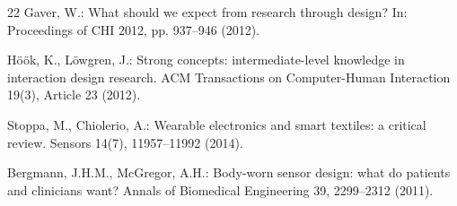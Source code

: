 \documentclass[runningheads]{llncs}
\begin{document}
\begin{thebibliography}{22}
Gaver, W.: What should we expect from research through design? In: Proceedings of CHI 2012, pp. 937--946 (2012). 

Höök, K., Löwgren, J.: Strong concepts: intermediate-level knowledge in interaction design research. ACM Transactions on Computer-Human Interaction 19(3), Article 23 (2012). 

Stoppa, M., Chiolerio, A.: Wearable electronics and smart textiles: a critical review. Sensors 14(7), 11957--11992 (2014). 

Bergmann, J.H.M., McGregor, A.H.: Body-worn sensor design: what do patients and clinicians want? Annals of Biomedical Engineering 39, 2299--2312 (2011). 

\end{thebibliography}
\end{document}
